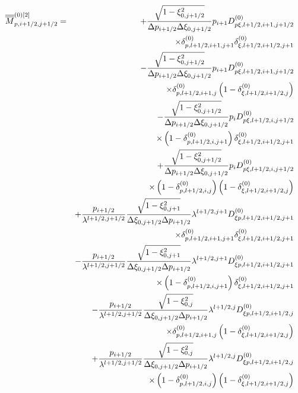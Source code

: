 \begin{eqnarray}
\overline{\overline{M}}_{p,i+1/2,j+1/2}^{\left( 0\right) \left[ 2\right] }
&=&+\frac{\sqrt{1-\xi _{0,j+1/2}^{2}}}{\Delta p_{i+1/2}\Delta \xi _{0,j+1/2}}%
p_{i+1}D_{p\xi ,l+1/2,i+1,j+1/2}^{\left( 0\right) }  \notag \\
&&\times \delta _{p,l+1/2,i+1,j+1}^{\left( 0\right) }\delta _{\xi
,l+1/2,i+1/2,j+1}^{\left( 0\right) }  \notag \\
&&-\frac{\sqrt{1-\xi _{0,j+1/2}^{2}}}{\Delta p_{i+1/2}\Delta \xi _{0,j+1/2}}%
p_{i+1}D_{p\xi ,l+1/2,i+1,j+1/2}^{\left( 0\right) }  \notag \\
&&\times \delta _{p,l+1/2,i+1,j}^{\left( 0\right) }\left( 1-\delta _{\xi
,l+1/2,i+1/2,j}^{\left( 0\right) }\right)   \notag \\
&&-\frac{\sqrt{1-\xi _{0,j+1/2}^{2}}}{\Delta p_{i+1/2}\Delta \xi _{0,j+1/2}}%
p_{i}D_{p\xi ,l+1/2,i,j+1/2}^{\left( 0\right) }  \notag \\
&&\times \left( 1-\delta _{p,l+1/2,i,j+1}^{\left( 0\right) }\right) \delta
_{\xi ,l+1/2,i+1/2,j+1}^{\left( 0\right) }  \notag \\
&&+\frac{\sqrt{1-\xi _{0,j+1/2}^{2}}}{\Delta p_{i+1/2}\Delta \xi _{0,j+1/2}}%
p_{i}D_{p\xi ,l+1/2,i,j+1/2}^{\left( 0\right) }  \notag \\
&&\times \left( 1-\delta _{p,l+1/2,i,j}^{\left( 0\right) }\right) \left(
1-\delta _{\xi ,l+1/2,i+1/2,j}^{\left( 0\right) }\right)   \notag \\
&&+\frac{p_{i+1/2}}{\lambda ^{l+1/2,j+1/2}}\frac{\sqrt{1-\xi _{0,j+1}^{2}}}{%
\Delta \xi _{0,j+1/2}\Delta p_{i+1/2}}\lambda ^{l+1/2,j+1}D_{\xi
p,l+1/2,i+1/2,j+1}^{\left( 0\right) }  \notag \\
&&\times \delta _{p,l+1/2,i+1,j+1}^{\left( 0\right) }\delta _{\xi
,l+1/2,i+1/2,j+1}^{\left( 0\right) }  \notag \\
&&-\frac{p_{i+1/2}}{\lambda ^{l+1/2,j+1/2}}\frac{\sqrt{1-\xi _{0,j+1}^{2}}}{%
\Delta \xi _{0,j+1/2}\Delta p_{i+1/2}}\lambda ^{l+1/2,j+1}D_{\xi
p,l+1/2,i+1/2,j+1}^{\left( 0\right) }  \notag \\
&&\times \left( 1-\delta _{p,l+1/2,i,j+1}^{\left( 0\right) }\right) \delta
_{\xi ,l+1/2,i+1/2,j+1}^{\left( 0\right) }  \notag \\
&&-\frac{p_{i+1/2}}{\lambda ^{l+1/2,j+1/2}}\frac{\sqrt{1-\xi _{0,j}^{2}}}{%
\Delta \xi _{0,j+1/2}\Delta p_{i+1/2}}\lambda ^{l+1/2,j}D_{\xi
p,l+1/2,i+1/2,j}^{\left( 0\right) }  \notag \\
&&\times \delta _{p,l+1/2,i+1,j}^{\left( 0\right) }\left( 1-\delta _{\xi
,l+1/2,i+1/2,j}^{\left( 0\right) }\right)   \notag \\
&&+\frac{p_{i+1/2}}{\lambda ^{l+1/2,j+1/2}}\frac{\sqrt{1-\xi _{0,j}^{2}}}{%
\Delta \xi _{0,j+1/2}\Delta p_{i+1/2}}\lambda ^{l+1/2,j}D_{\xi
p,l+1/2,i+1/2,j}^{\left( 0\right) }  \notag \\
&&\times \left( 1-\delta _{p,l+1/2,i,j}^{\left( 0\right) }\right) \left(
1-\delta _{\xi ,l+1/2,i+1/2,j}^{\left( 0\right) }\right) 
\end{eqnarray}%
